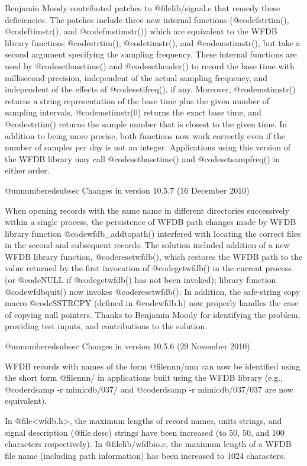 {{{{{{{{Benjamin Moody contributed patches to @file{lib/signal.c} that remedy these
deficiencies.  The patches include three new internal functions
(@code{fstrtim()}, @code{ftimstr()}, and @code{fmstimstr()}) which are
equivalent to the WFDB library functions @code{strtim()}, @code{timstr()}, and
@code{mstimstr()}, but take a second argument specifying the sampling
frequency.  These internal functions are used by @code{setbasetime()} and
@code{setheader()} to record the base time with millisecond precision,
independent of the actual sampling frequency, and independent of the effects of
@code{setifreq()}, if any.  Moreover, @code{mstimstr()} returns a string
representation of the base time plus the given number of sampling intervals,
@code{mstimstr(0)} returns the exact base time, and @code{strtim()} returns the
sample number that is closest to the given time.  In addition to being more
precise, both functions now work correctly even if the number of samples per
day is not an integer.  Applications using this version of the WFDB library may
call @code{setbasetime()} and @code{setsampfreq()} in either order.

@unnumberedsubsec Changes in version 10.5.7 (16 December 2010)

When opening records with the same name in different directories successively
within a single process, the persistence of WFDB path changes made by WFDB
library function @code{wfdb_addtopath()} interfered with locating the correct
files in the second and subsequent records.  The solution included addition of
a new WFDB library function, @code{resetwfdb()}, which restores the WFDB path
to the value returned by the first invocation of @code{getwfdb()} in the
current process (or @code{NULL} if @code{getwfdb()} has not been invoked);
library function @code{wfdbquit()} now invokes @code{resetwfdb()}.  In
addition, the safe-string copy macro @code{SSTRCPY} (defined in @code{wfdb.h})
now properly handles the case of copying null pointers.  Thanks to Benjamin
Moody for identifying the problem, providing test inputs, and contributions to
the solution.

@unnumberedsubsec Changes in version 10.5.6 (29 November 2010)

WFDB records with names of the form @file{nnn/nnn} can now be identified
using the short form @file{nnn/} in applications built using the WFDB library
(e.g., @code{rdsamp -r mimicdb/037/} and @code{rdsamp -r mimicdb/037/037} are
now equivalent).

In @file{<wfdb.h>}, the maximum lengths of record names, units strings, and
signal description (@file{.desc}) strings have been increased (to 50, 50,
and 100 characters respectively).  In @file{lib/wfdbio.c}, the maximum length
of a WFDB file name (including path information) has been increased to
1024 characters.

}}}}}}}}
